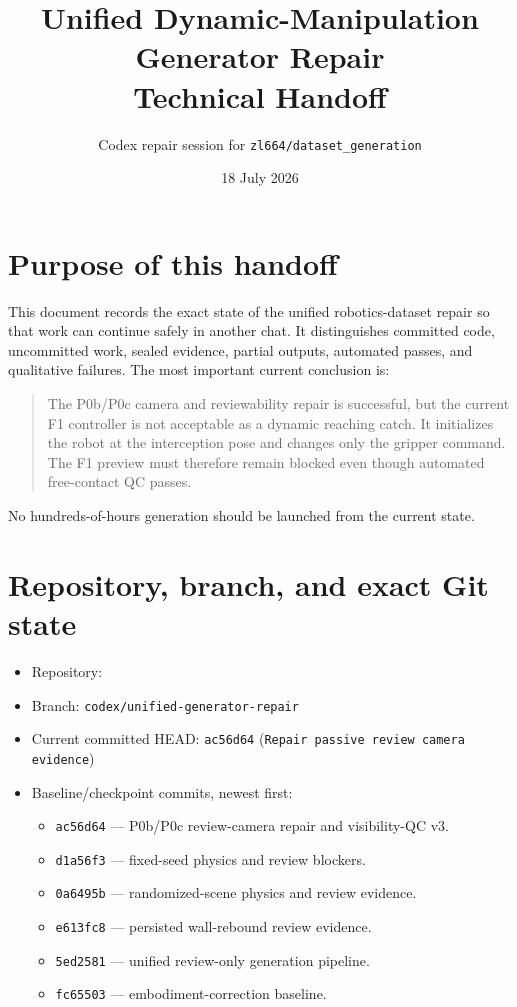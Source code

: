 \documentclass[11pt]{article}
\title{Unified Dynamic-Manipulation Generator Repair\\Technical Handoff}
\author{Codex repair session for \texttt{zl664/dataset\_generation}}
\date{18 July 2026}
\begin{document}
\maketitle

\section{Purpose of this handoff}

This document records the exact state of the unified robotics-dataset repair so
that work can continue safely in another chat.  It distinguishes committed
code, uncommitted work, sealed evidence, partial outputs, automated passes, and
qualitative failures.  The most important current conclusion is:

\begin{quote}
The P0b/P0c camera and reviewability repair is successful, but the current F1
controller is not acceptable as a dynamic reaching catch.  It initializes the
robot at the interception pose and changes only the gripper command.  The F1
preview must therefore remain blocked even though automated free-contact QC
passes.
\end{quote}

No hundreds-of-hours generation should be launched from the current state.

\section{Repository, branch, and exact Git state}

\begin{itemize}
  \item Repository: 
  \item Branch: \texttt{codex/unified-generator-repair}
  \item Current committed HEAD: \texttt{ac56d64} (\texttt{Repair passive review camera evidence})
  \item Baseline/checkpoint commits, newest first:
    \begin{itemize}
      \item \texttt{ac56d64} --- P0b/P0c review-camera repair and visibility-QC v3.
      \item \texttt{d1a56f3} --- fixed-seed physics and review blockers.
      \item \texttt{0a6495b} --- randomized-scene physics and review evidence.
      \item \texttt{e613fc8} --- persisted wall-rebound review evidence.
      \item \texttt{5ed2581} --- unified review-only generation pipeline.
      \item \texttt{fc65503} --- embodiment-correction baseline.
    \end{itemize}
\end{itemize}
\end{document}
